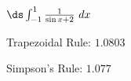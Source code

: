 {$\ds \int_{-1}^{1} \frac{1}{\sin x+2} \ dx$}
{Trapezoidal Rule: 	$1.0803$

Simpson's Rule: $1.077$
}